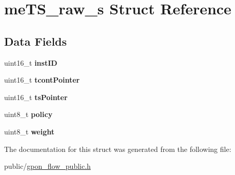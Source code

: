 \hypertarget{structmeTS__raw__s}{}\section{me\+T\+S\+\_\+raw\+\_\+s Struct Reference}
\label{structmeTS__raw__s}
\subsection*{Data Fields}
\begin{DoxyCompactItemize}
\item 
\mbox{\label{structmeTS__raw__s_a36cd854c3eb3340e3cc77a3cd1bebfad}} 
uint16\+\_\+t {\bfseries inst\+ID}
\item 
\mbox{\label{structmeTS__raw__s_a309c044e1b92d37afe468b720f20bc00}} 
uint16\+\_\+t {\bfseries tcont\+Pointer}
\item 
\mbox{\label{structmeTS__raw__s_a01037eff4694cd79b85f8158ec3dd21a}} 
uint16\+\_\+t {\bfseries ts\+Pointer}
\item 
\mbox{\label{structmeTS__raw__s_a7cfb9e14cf2d9c90fae1ab17bd99b854}} 
uint8\+\_\+t {\bfseries policy}
\item 
\mbox{\label{structmeTS__raw__s_ae56d0b09cc7b3bf1c65ecb31b969ed1b}} 
uint8\+\_\+t {\bfseries weight}
\end{DoxyCompactItemize}


The documentation for this struct was generated from the following file\+:\begin{DoxyCompactItemize}
\item 
public/\hyperlink{gpon__flow__public_8h}{gpon\+\_\+flow\+\_\+public.\+h}\end{DoxyCompactItemize}
